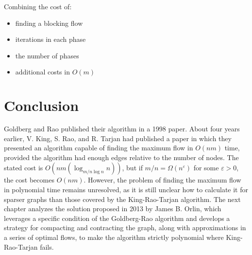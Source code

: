     Combining the cost of:
    \begin{itemize}[label=$\times$]
        \item finding a blocking flow
        \item iterations in each phase
        \item the number of phases
        \item additional costs in \( O(m) \)
    \end{itemize}
    
    \section*{Conclusion}
    Goldberg and Rao published their algorithm in a 1998 paper. About four years earlier, V. King, S. Rao, and R. Tarjan had published a paper in which they presented an algorithm capable of finding the maximum flow in \( O(nm) \) time, provided the algorithm had enough edges relative to the number of nodes.  
    The stated cost is \( O(nm(\log_{m/n \log n} n)) \), but if \( m/n = \Omega(n^\varepsilon) \) for some \( \varepsilon > 0 \), the cost becomes \( O(nm) \).  
    However, the problem of finding the maximum flow in polynomial time remains unresolved, as it is still unclear how to calculate it for sparser graphs than those covered by the King-Rao-Tarjan algorithm.  
    The next chapter analyzes the solution proposed in 2013 by James B. Orlin, which leverages a specific condition of the Goldberg-Rao algorithm and develops a strategy for compacting and contracting the graph, along with approximations in a series of optimal flows, to make the algorithm strictly polynomial where King-Rao-Tarjan fails.
\cleardoublepage